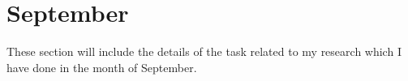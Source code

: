 \chapter{September}
\label{chap:Sept}


These section will include the details of the task related to my research which I have done in the month of September.




